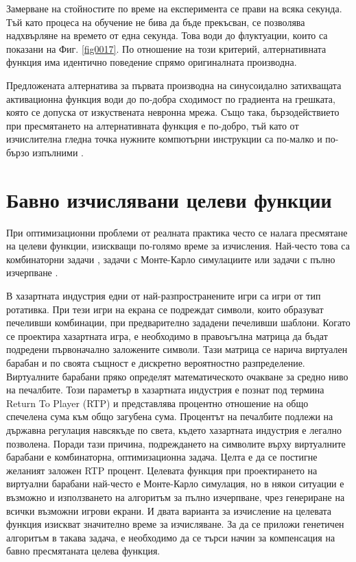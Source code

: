 Замерване на стойностите по време на експеримента се прави на всяка секунда. Тъй като процеса на обучение не бива да бъде прекъсван, се позволява надхвърляне на времето от една секунда. Това води до флуктуации, които са показани на Фиг. \ref{fig0017}. По отношение на този критерий, алтернативната функция има идентично поведение спрямо оригиналната производна.

Предложената алтернатива за първата производна на синусоидално затихващата активационна функция води до по-добра сходимост по градиента на грешката, която се допуска от изкуствената невронна мрежа. Също така, бързодействието при пресмятането на алтернативната функция е по-добро, тъй като от изчислителна гледна точка нужните компютърни инструкции са по-малко и по-бързо изпълними \cite{Zankinski-01}.

\section{Бавно изчислявани целеви функции}

При оптимизационни проблеми от реалната практика често се налага пресмятане на целеви функции, изискващи по-голямо време за изчисления. Най-често това са комбинаторни задачи \cite{Koleva-01}, задачи с Монте-Карло симулациите или задачи с пълно изчерпване \cite{Keremedchiev-01}.

В хазартната индустрия едни от най-разпространените игри са игри от тип ротативка. При тези игри на екрана се подреждат символи, които образуват печеливши комбинации, при предварително зададени печеливши шаблони. Когато се проектира хазартната игра, е необходимо в правоъгълна матрица да бъдат подредени първоначално заложените символи. Тази матрица се нарича виртуален барабан и по своята същност е дискретно вероятностно разпределение. Виртуалните барабани пряко определят математическото очакване за средно ниво на печалбите. Този параметър в хазартната индустрия е познат под термина Return To Player (RTP) и представлява процентно отношение на общо спечелена сума към общо загубена сума. Процентът на печалбите подлежи на държавна регулация навсякъде по света, където хазартната индустрия е легално позволена. Поради тази причина, подреждането на символите върху виртуалните барабани е комбинаторна, оптимизационна задача. Целта е да се постигне желаният заложен RTP процент. Целевата функция при проектирането на виртуални барабани най-често е Монте-Карло симулация, но в някои ситуации е възможно и използването на алгоритъм за пълно изчерпване, чрез генериране на всички възможни игрови екрани. И двата варианта за изчисление на целевата функция изискват значително време за изчисляване. За да се приложи генетичен алгоритъм в такава задача, е необходимо да се търси начин за компенсация на бавно пресмятаната целева функция. 

